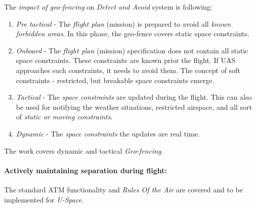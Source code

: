 \noindent The \emph{impact of geo-fencing} on \emph{Detect and Avoid} system is following:
\begin{enumerate}
    \item \emph{Pre tactical} - The \emph{flight plan} (mission) is prepared to avoid all \emph{known forbidden areas}. In this phase, the geo-fence covers static space constraints.
    
    \item \emph{Onboard} - The \emph{flight plan} (mission) specification does not contain all static space constraints. These constraints are known prior the flight. If UAS approaches such constraints, it needs to avoid them. The concept of soft constraints - restricted, but breakable space constraints emerge. 
    
    \item \emph{Tactical} - The \emph{space constraints} are updated during the flight. This can also be used for notifying the weather situations, restricted airspace, and all sort of \emph{static or moving constraints}.
    
    \item \emph{Dynamic} - The \emph{space constraints} the updates are real time.
\end{enumerate}

\begin{note}
    The work covers dynamic and tactical \emph{Geo-fencing}.
\end{note}

\paragraph{Actively maintaining separation during flight:} The standard ATM functionality \cite{icao4444} and \emph{Rules Of the Air} \cite{icaoAnnex2,icaoAnnex11} are covered and to be implemented for \emph{U-Space}.
